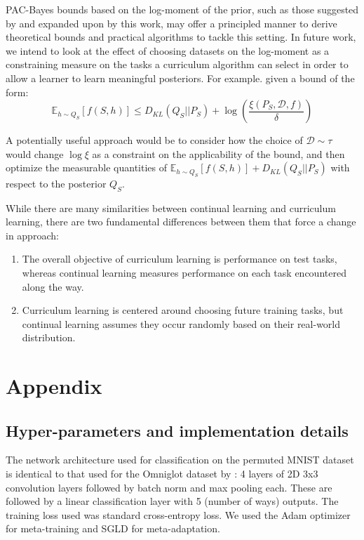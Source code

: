 \documentclass{article}
\theoremstyle{definition}
\newcommand{\Expect}[2]{\mathbb{E}_{#1}\left [#2 \right ]}
\begin{document}
PAC-Bayes bounds based on the log-moment of the prior, such as those suggested by \citet{Rivasplata2020} and expanded upon by this work, may offer a principled manner to derive theoretical bounds and practical algorithms to tackle this setting. In future work, we intend to look at the effect of choosing datasets on the log-moment as a constraining measure on the tasks a curriculum algorithm can select in order to allow a learner to learn meaningful posteriors. For example. given a bound of the form:
$$	\Expect{h\sim Q_S}{f(S, h)} \leq D_{KL}(Q_S||P_S)+\log\left (\frac{\xi(P_S, \mathcal{D}, f)}{\delta}\right )$$

A potentially useful approach would be to consider how the choice of $\mathcal{D}\sim \tau$ would change $\log\xi$ as a constraint on the applicability of the bound, and then optimize the measurable quantities of $\Expect{h\sim Q_S}{f(S, h)} + D_{KL}(Q_S||P_S)$ with respect to the posterior $Q_S$.

While there are many similarities between continual learning and curriculum learning, there are two fundamental differences between them that force a change in approach:
\begin{enumerate}
	\item The overall objective of curriculum learning is performance on test tasks, whereas continual learning measures performance on each task encountered along the way.
	\item Curriculum learning is centered around choosing future training tasks, but continual learning assumes they occur randomly based on their real-world distribution.
\end{enumerate}


\clearpage



\clearpage
\appendix
\section{Appendix}

\subsection{Hyper-parameters and implementation details} \label{append:hyper-params}

The network architecture used for classification on the permuted MNIST dataset is identical to that used for the Omniglot dataset by \citet{Vinyals2016}: 4 layers of 2D 3x3 convolution layers followed by batch norm and max pooling each. These are followed by a linear classification layer with 5 (number of ways) outputs. The training loss used was standard cross-entropy loss. We used the Adam optimizer for meta-training and SGLD for meta-adaptation.
\end{document}
